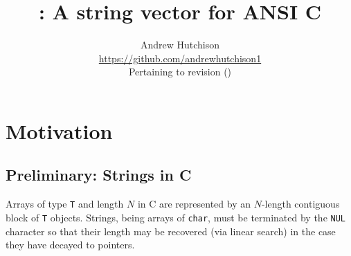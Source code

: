 \documentclass[11pt,a4paper]{article}
\title{\stringv{}: A string vector for ANSI C}
\author{%
    Andrew Hutchison \\%
    \url{https://github.com/andrewhutchison1} \\%
    Pertaining to revision \gitAbbrevHash (\gitAuthorDate)}
\begin{document}
\maketitle

\tableofcontents

\section{Motivation}
\subsection{Preliminary: Strings in C}
Arrays of type \texttt{T} and length $N$ in C are represented by an $N$-length
contiguous block of \texttt{T} objects.
Strings, being arrays of \texttt{char}, must be terminated by the \texttt{NUL}
character so that their length may be recovered (via linear search) in the case
they have decayed to pointers.
\end{document}
